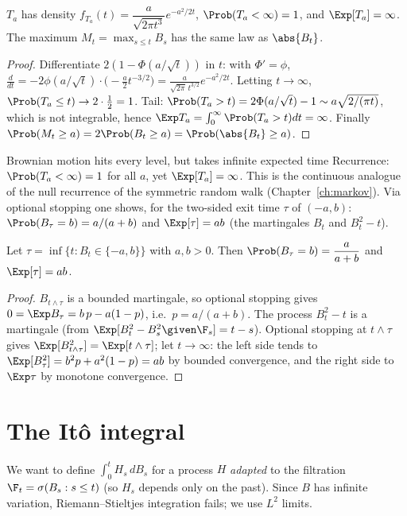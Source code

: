 \begin{corollary}\label{cor:bmhit}
$T_a$ has density $f_{T_a}(t)=\dfrac{a}{\sqrt{2\pi t^3}}e^{-a^2/2t}$, $\Prob(T_a<\infty)=1$,
and $\Exp[T_a]=\infty$. The maximum $M_t=\max_{s\le t}B_s$ has the same law as $\abs{B_t}$.
\end{corollary}
\begin{proof}
Differentiate $2(1-\Phi(a/\sqrt t))$ in $t$: with $\Phi'=\phi$,
$\frac d{dt}=-2\phi(a/\sqrt t)\cdot\bigl(-\tfrac a2t^{-3/2}\bigr)=\frac{a}{\sqrt{2\pi}\,t^{3/2}}e^{-a^2/2t}$.
Letting $t\to\infty$, $\Prob(T_a\le t)\to2\cdot\tfrac12=1$. Tail: $\Prob(T_a>t)=2\Phi(a/\sqrt t)-1\sim a\sqrt{2/(\pi t)}$,
which is not integrable, hence $\Exp T_a=\int_0^\infty\Prob(T_a>t)dt=\infty$. Finally
$\Prob(M_t\ge a)=2\Prob(B_t\ge a)=\Prob(\abs{B_t}\ge a)$.
\end{proof}

\begin{interview}{Brownian motion hits every level, but takes infinite expected time}
Recurrence: $\Prob(T_a<\infty)=1$ for all $a$, yet $\Exp[T_a]=\infty$. This is the
continuous analogue of the null recurrence of the symmetric random walk
(Chapter~\ref{ch:markov}). Via optional stopping one shows, for the two-sided exit time $\tau$ of
$(-a,b)$: $\Prob(B_\tau=b)=a/(a+b)$ and $\Exp[\tau]=ab$ (the martingales $B_t$ and $B_t^2-t$).
\end{interview}

\begin{theorem}\label{thm:bmexit}
Let $\tau=\inf\{t:B_t\in\{-a,b\}\}$ with $a,b>0$. Then $\Prob(B_\tau=b)=\dfrac a{a+b}$ and $\Exp[\tau]=ab$.
\end{theorem}
\begin{proof}
$B_{t\wedge\tau}$ is a bounded martingale, so optional stopping gives
$0=\Exp B_\tau=b\,p-a(1-p)$, i.e.\ $p=a/(a+b)$. The process $B_t^2-t$ is a martingale
(from $\Exp[B_t^2-B_s^2\given\F_s]=t-s$). Optional stopping at $t\wedge\tau$ gives
$\Exp[B_{t\wedge\tau}^2]=\Exp[t\wedge\tau]$; let $t\to\infty$: the left side tends to
$\Exp[B_\tau^2]=b^2p+a^2(1-p)=ab$ by bounded convergence, and the right side
to $\Exp\tau$ by monotone convergence.
\end{proof}

\section{The It\^o integral}

We want to define $\int_0^tH_s\,dB_s$ for a process $H$ \emph{adapted} to the filtration
$\F_t=\sigma(B_s:s\le t)$ (so $H_s$ depends only on the past). Since $B$ has infinite
variation, Riemann--Stieltjes integration fails; we use $L^2$ limits.

